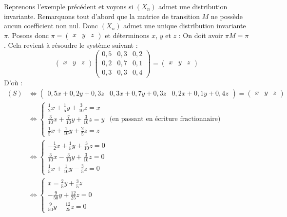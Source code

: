 	\begin{tip}[Exemple]
		\contentwidth[big]
		Reprenons l'exemple précédent et voyons si $(X_n)$ admet une distribution invariante.
		\newpar
		Remarquons tout d'abord que la matrice de transition $M$ ne possède aucun coefficient non nul. Donc $(X_n)$ admet une unique distribution invariante $\pi$.
		\newpar
		Posons donc $\pi = \begin{pmatrix} x & y & z \end{pmatrix}$ et déterminons $x$, $y$ et $z$ :
		\newpar
		On doit avoir $\pi M = \pi$. Cela revient à résoudre le système suivant :
		\[ \begin{pmatrix} x & y & z \end{pmatrix} \begin{pmatrix} 0,5 & 0,3 & 0,2 \\ 0,2 & 0,7 & 0,1 \\ 0,3 & 0,3 & 0,4 \end{pmatrix} = \begin{pmatrix} x & y & z \end{pmatrix} \tag{S} \]
		D'où :
		\begin{align*}
			(S) &\iff \begin{pmatrix} 0,5x + 0,2y + 0,3z & 0,3x + 0,7y + 0,3z & 0,2x + 0,1y + 0,4z \end{pmatrix} = \begin{pmatrix} x & y & z \end{pmatrix} \\
			&\iff \begin{cases} \frac{1}{2}x + \frac{1}{5}y + \frac{3}{10}z = x \\ \frac{3}{10}x + \frac{7}{10}y + \frac{3}{10}z = y \\ \frac{1}{5}x + \frac{1}{10}y + \frac{2}{5}z = z \end{cases} \text{ (en passant en écriture fractionnaire)} \\
			&\iff \begin{cases} -\frac{1}{2}x + \frac{1}{5}y + \frac{3}{10}z = 0 \\ \frac{3}{10}x - \frac{3}{10}y + \frac{3}{10}z = 0 \\ \frac{1}{5}x + \frac{1}{10}y - \frac{3}{5}z = 0 \end{cases} \\
			&\iff \begin{cases} x = \frac{2}{5}y + \frac{3}{5}z \\ -\frac{9}{50}y + \frac{12}{25}z = 0 \\ \frac{9}{50}y - \frac{12}{25}z = 0 \end{cases} \\

\end{align*}
\end{tip}
